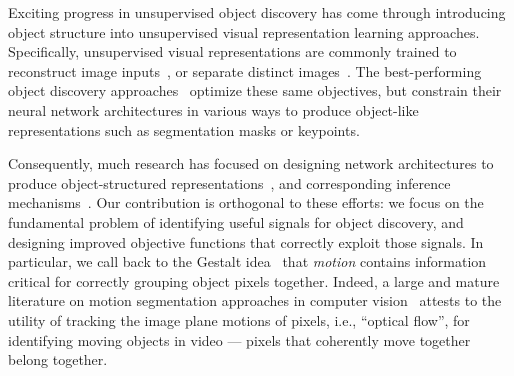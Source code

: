 \documentclass{article}
\newcommand{\jd}[1]{\textcolor{orange}{[DJ: #1]}}
\begin{document}

Exciting progress in unsupervised object discovery has come through introducing object structure into unsupervised visual representation learning approaches. Specifically, unsupervised visual representations are commonly trained to reconstruct image inputs~\cite{oord2017neural, dippel2021towards}, or separate distinct images~\cite{chen2020improved,chen2020simple}. The best-performing object discovery approaches~\cite{eslami2016attend,jakab2018unsupervised,jakab2020self,greff2019multi, burgess2019monet,crawford2019spatially,locatello2020object,racah2020slot, lowe2020learning, Kulkarni2019UnsupervisedLO, minderer2019unsupervised, engelcke2019genesis, lin2020space} optimize these same objectives, but constrain their neural network architectures in various ways to produce object-like representations such as segmentation masks or keypoints.  %



Consequently, much research has focused on designing network architectures to produce object-structured representations~\cite{jakab2018unsupervised,jakab2020self,Kulkarni2019UnsupervisedLO,lowe2020learning,locatello2020object,crawford2019spatially}, and corresponding inference mechanisms~\cite{eslami2016attend, greff2019multi, engelcke2019genesis}. Our contribution is orthogonal to these efforts: we focus on the fundamental problem of identifying useful signals for object discovery, and designing improved objective functions that correctly exploit those signals. In particular, we call back to the Gestalt idea~\cite{wertheimer1938laws} that \emph{motion} contains information critical for correctly grouping object pixels together. Indeed, a large and mature literature on motion segmentation approaches in computer vision~\cite{tron2007benchmark,yan2006general,keuper2018motion,bideau2018moa, yang2021rigidmask} attests to the utility of tracking the image plane motions of pixels, i.e., ``optical flow'', for identifying moving objects in video --- pixels that coherently move together belong together.
\end{document}

